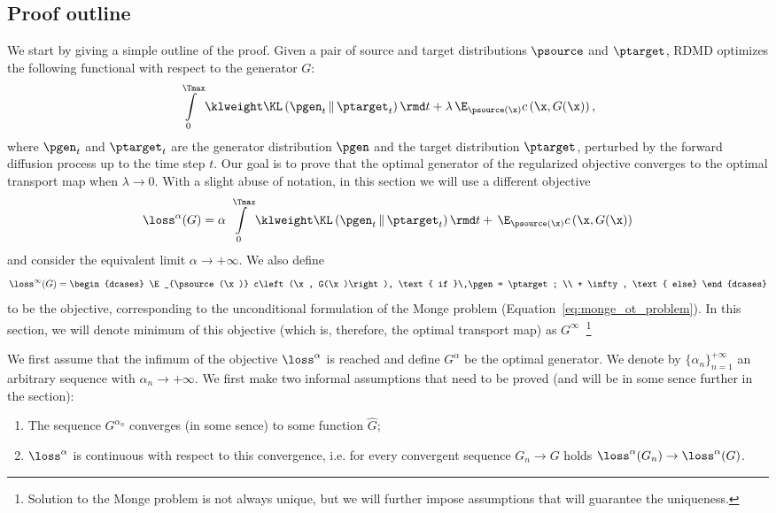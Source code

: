 \subsection{Proof outline}
\label{subsec:proof_outline}
We start by giving a simple outline of the proof. Given a pair of source and target distributions $\psource$ and $\ptarget$, RDMD optimizes the following functional with respect to the generator $G$:
\begin{equation}
    \int\limits_{0}^{\Tmax} \klweight \KL\left(\pgen_t \,\|\, \ptarget_t\right) \rmd t + \lambda\,\E_{\psource(\x)} c\left(\x, G(\x)\right),
\end{equation}
where $\pgen_t$ and $\ptarget_t$ are the generator distribution $\pgen$ and the target distribution $\ptarget$, perturbed by the forward diffusion process up to the time step $t$. Our goal is to prove that the optimal generator of the regularized objective converges to the optimal transport map when $\lambda \rightarrow 0$. With a slight abuse of notation, in this section we will use a different objective
\begin{equation}
\label{eq:rdmd_alpha}
    \loss^\alpha(G) = \alpha\, \int\limits_{0}^{\Tmax} \klweight \KL\left(\pgen_t \,\|\, \ptarget_t\right) \rmd t + \,\E_{\psource(\x)} c\left(\x, G(\x)\right)
\end{equation}
and consider the equivalent limit $\alpha \rightarrow + \infty$. We also define 
\begin{equation}
    \loss^\infty(G) = \begin{dcases}
        \E_{\psource(\x)} c\left(\x, G(\x)\right), \text{ if }\,\pgen = \ptarget; \\
        + \infty, \text{ else}
    \end{dcases}
\end{equation}
to be the objective, corresponding to the unconditional formulation of the Monge problem (Equation~\ref{eq:monge_ot_problem}). In this section, we will denote minimum of this objective (which is, therefore, the optimal transport map) as $G^\infty$~\footnote{Solution to the Monge problem is not always unique, but we will further impose assumptions that will guarantee the uniqueness.}

We first assume that the infimum of the objective $\loss^\alpha$ is reached and define $G^\alpha$ be the optimal generator. We denote by $\{\alpha_n\}_{n = 1}^{+ \infty}$ an arbitrary sequence with $\alpha_n \rightarrow +\infty$. We first make two informal assumptions that need to be proved (and will be in some sence further in the section):
\begin{enumerate}
    \item The sequence $G^{\alpha_n}$ converges (in some sence) to some function $\hat{G}$;
    \item $\loss^\alpha$ is continuous with respect to this convergence, i.e. for every convergent sequence $G_n \rightarrow G$ holds $\loss^\alpha(G_n) \rightarrow \loss^\alpha(G)$.
\end{enumerate}

